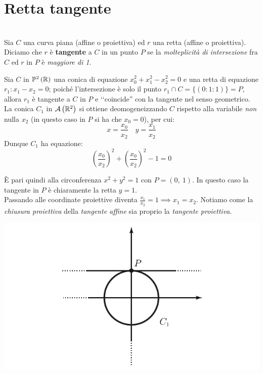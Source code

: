 \section{Retta tangente}
\begin{define}~{}\\
Sia $C$ una curva piana (affine o proiettiva) ed $r$ una retta (affine o proiettiva). Diciamo che $r$ è \textbf{tangente}  a $C$ in un punto $P$ se la \textit{molteplicità di intersezione} fra $C$ ed $r$ in $P$ è \textit{maggiore di 1}.
\end{define}
\begin{example}	Sia $C$ in $\proj[2]{\realset}$ una conica di equazione $x_0^2+x_1^2-x_2^2=0$ e una retta di equazione $r_1\colon x_1-x_2=0$; poiché l'intersezione è solo il punto $r_1\cap C=\{(0\colon 1\colon 1)\}=P$, allora $r_1$ è tangente a $C$ in $P$ e ‘‘coincide'' con la tangente nel senso geometrico.\\
La conica $C_1$ in ${\mathcal{A}\left(\mathbb{R}^2\right)}$ si ottiene deomogeneizzando $C$ rispetto alla variabile \textit{non} nulla $x_2$ (in questo caso in $P$ si ha che $x_0=0$), per cui:
\begin{equation*}
		x=\frac{x_0}{x_2}\quad y=\frac{x_1}{x_2}
	\end{equation*}
	Dunque $C_1$ ha equazione:
	\begin{equation*}
		\left( \frac{x_0}{x_2} \right)^2 + \left( \frac{x_0}{x_2} \right)^2 -1 =0
	\end{equation*}
\begin{minipage}{0.75\textwidth}
È pari quindi alla circonferenza $x^2+y^2=1$ con $P=(0,\ 1)$. In questo caso la tangente in $P$ è chiaramente la retta $y=1$.\\
Passando alle coordinate proiettive diventa $\frac{x_1}{x_2}=1 \implies x_1=x_2$. Notiamo come la \textit{chiusura proiettiva} della \textit{tangente affine} sia proprio la \textit{tangente proiettiva}.
\end{minipage}
\hspace{-12mm}
\begin{minipage}{0.24\textwidth}
	\includegraphics[trim=0cm 0cm 0cm 0cm,clip,scale=0.50]{images/planecurve1.pdf}
\end{minipage}
\end{example}

